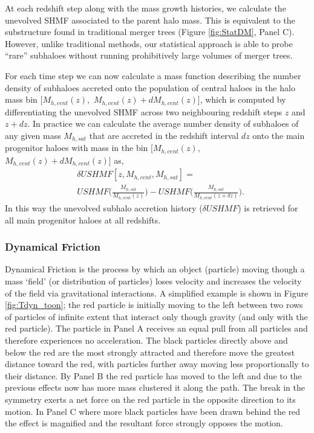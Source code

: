 At each redshift step along with the mass growth histories, we calculate the unevolved SHMF associated to the parent halo mass. This is equivalent to the substructure found in traditional merger trees (Figure \ref{fig:StatDM}, Panel C). However, unlike traditional methods, our statistical approach is able to probe ``rare'' subhaloes without running prohibitively large volumes of merger trees.

For each time step we can now calculate a mass function describing the number density of subhaloes accreted onto the population of central haloes in the halo mass bin $[M_{h,cent}(z),$ $M_{h,cent}(z) + dM_{h,cent}(z)]$, which is computed by differentiating the unevolved SHMF across two neighbouring redshift steps $z$ and $z+dz$. In practice we can calculate the average number density of subhaloes of any given mass $M_{h, sat}$ that are accreted in the redshift interval $dz$ onto the main progenitor haloes with mass in the bin $[M_{h,cent}(z),$ $M_{h,cent}(z) + dM_{h,cent}(z)]$ as,
\begin{equation}
\label{eqn:deltSHMF}
\begin{split}
&\delta USHMF[z, M_{h,cent},M_{h,sat}] =  \\
&USHMF\Big(\frac{M_{h,sat}}{M_{h,cent}(z)}\Big) - USHMF\Big(\frac{M_{h,sat}}{M_{h,cent}(z + \delta z)}\Big).
\end{split}
\end{equation}
In this way the unevolved subhalo accretion history ($\delta USHMF$) is retrieved for all main progenitor haloes at all redshifts.

\subsubsection{Dynamical Friction}
\label{subsub:DynF}
Dynamical Friction is the process by which an object (particle) moving though a mass `field' (or distribution of particles) loses velocity and increases the velocity of the field via gravitational interactions. A simplified example is shown in Figure \ref{fig:Tdyn_toon}; the red particle is initially moving to the left between two rows of particles of infinite extent that interact only though gravity (and only with the red particle). The particle in Panel A receives an equal pull from all particles and therefore experiences no acceleration. The black particles directly above and below the red are the most strongly attracted and therefore move the greatest distance toward the red, with particles further away moving less proportionally to their distance. By Panel B the red particle has moved to the left and due to the previous effects now has more mass clustered it along the path. The break in the symmetry exerts a net force on the red particle in the opposite direction to its motion. In Panel C where more black particles have been drawn behind the red the effect is magnified and the resultant force strongly opposes the motion. 

